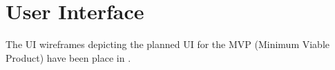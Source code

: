 \newpage
\section{User Interface}

The UI wireframes depicting the planned UI for the MVP (Minimum Viable Product) have been place in \textit{}.






